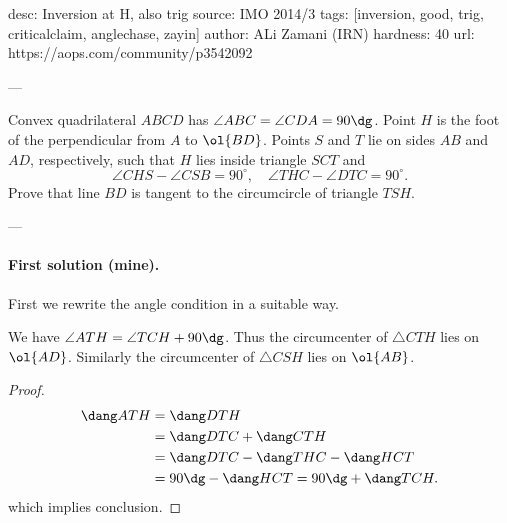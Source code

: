 desc:  Inversion at H, also trig
source:  IMO 2014/3
tags:  [inversion, good, trig, criticalclaim, anglechase, zayin]
author: ALi Zamani (IRN)
hardness: 40
url: https://aops.com/community/p3542092

---

Convex quadrilateral $ABCD$ has $\angle ABC = \angle CDA = 90\dg$.
Point $H$ is the foot of the perpendicular from $A$ to $\ol{BD}$.
Points $S$ and $T$ lie on sides $AB$ and $AD$,
respectively, such that $H$ lies inside triangle $SCT$ and
\[ \angle CHS - \angle CSB = 90^{\circ},
  \quad \angle THC - \angle DTC = 90^{\circ}. \]
Prove that line $BD$ is tangent to the circumcircle of triangle $TSH$.

---

\paragraph{First solution (mine).}
First we rewrite the angle condition in a suitable way.
\begin{claim*}
  We have $\angle ATH = \angle TCH + 90\dg$.
  Thus the circumcenter of $\triangle CTH$ lies on $\ol{AD}$.
  Similarly the circumcenter of $\triangle CSH$ lies on $\ol{AB}$.
\end{claim*}
\begin{proof}
  \begin{align*}
    \dang ATH &= \dang DTH \\
    &= \dang DTC + \dang CTH \\
    &= \dang DTC - \dang THC - \dang HCT \\
    &= 90\dg - \dang HCT = 90\dg + \dang TCH.
  \end{align*}
  which implies conclusion.
\end{proof}

